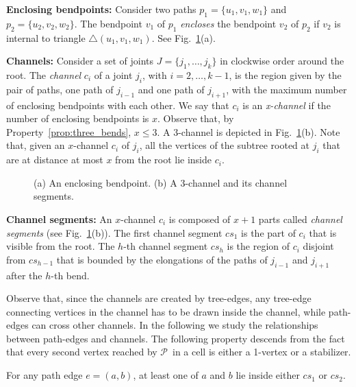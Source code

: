 \documentclass[a4paper,10pt]{llncs}
\newcounter{prop}
\renewcommand{\P}{\mbox{$\mathcal P$ }}
\begin{document}
{\bf Enclosing bendpoints:}
Consider two paths $p_1 = \{u_1,v_1,w_1\}$ and $ p_2= \{ u_2,v_2,w_2\}$. The bendpoint $v_1$ of $p_1$ \emph{encloses} the bendpoint $v_2$ of $p_2$ if $v_2$ is internal to triangle $\triangle (u_1,v_1,w_1)$. See Fig.~\ref{fig:bendpoint}(a).

{\bf Channels:}
Consider a set of joints $J =\{j_1, \ldots , j_k \}$ in clockwise order around the root. The \emph{channel} $c_i$ of a joint $j_i$, with $i=2,\dots,k-1$, is the region given by the pair of paths, one path of $j_{i-1}$ and one path of $j_{i+1}$, with the maximum number of enclosing bendpoints with each other. We say that $c_i$ is an \emph{x-channel} if the number of enclosing bendpoints is $x$. Observe that, by Property~\ref{prop:three_bends}, $x\leq 3$. A $3$-channel is depicted in Fig.~\ref{fig:bendpoint}(b). Note that, given an $x$-channel $c_i$ of $j_i$, all the vertices of the subtree rooted at $j_i$ that are at distance at most $x$ from the root lie inside $c_i$.

\begin{figure}[tb]
\caption{(a) An enclosing bendpoint. (b) A $3$-channel and its channel segments.}\label{fig:bendpoint}
\end{figure}

{\bf Channel segments:}
An $x$-channel $c_i$ is composed of $x+1$ parts called \emph{channel segments} (see Fig.~\ref{fig:bendpoint}(b)). The first channel segment $cs_1$ is the part of $c_i$ that is visible from the root. The $h$-th channel segment $cs_h$ is the region of $c_i$ disjoint from $cs_{h-1}$ that is bounded by the elongations of the paths of $j_{i-1}$ and $j_{i+1}$ after the $h$-th bend.

Observe that, since the channels are created by tree-edges, any tree-edge connecting vertices in the channel has to be drawn inside the channel, while path-edges can cross other channels. In the following we study the relationships between path-edges and channels. The following property descends from the fact that every second vertex reached by \P in a cell is either a 1-vertex or a stabilizer.

\begin{property}\label{prop:CS_1_2}
For any path edge $e=(a,b)$, at least one of $a$ and $b$ lie inside either $cs_1$ or $cs_2$.
\end{property}
\end{document}
